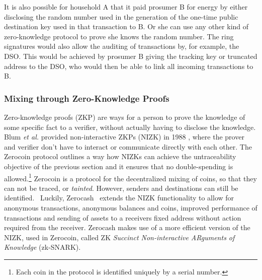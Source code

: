 It is also possible for household A that it paid prosumer B for energy by either disclosing the random number used in the generation of the one-time public destination key used in that transaction to B. Or she can use any other kind of zero-knowledge protocol to prove she knows the random number. The ring signatures would also allow the auditing of transactions by, for example, the DSO. This would be achieved by prosumer B giving the tracking key or truncated address to the DSO, who would then be able to link all incoming transactions to B.

\subsubsection{Mixing through Zero-Knowledge Proofs}
Zero-knowledge proofs (ZKP) are ways for a person to prove the knowledge of some specific fact to a verifier, without actually having to disclose the knowledge. Blum \textit{et al.} provided non-interactive ZKPs (NIZK) in 1988 \cite{Blum:1988:NZA:62212.62222}, where the prover and verifier don't have to interact or communicate directly with each other. The Zerocoin protocol \cite{miers2013zerocoin} outlines a way how NIZKs can achieve the untraceability objective of the previous section and it ensures that no double-spending is allowed.\footnote{Each coin in the protocol is identified uniquely by a serial number.} Zerocoin is a protocol for the decentralized mixing of coins, so that they can not be traced, or \textit{tainted}. However, senders and destinations can still be identified.~\cite{miers2013zerocoin} Luckily, Zerocash~\cite{Sasson:2014:ZDA:2650286.2650810} extends the NIZK functionality to allow for anonymous transactions, anonymous balances and coins, improved performance of transactions and sending of assets to a receivers fixed address without action required from the receiver. Zerocash makes use of a more efficient version of the NIZK, used in Zerocoin, called ZK \textit{Succinct Non-interactive ARguments of Knowledge} (zk-SNARK). 

